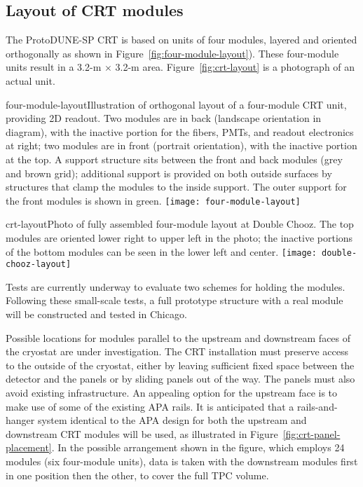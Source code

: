 \subsection{Layout of CRT modules}

The ProtoDUNE-SP CRT is based on units of four modules, layered and oriented orthogonally as shown in Figure~\ref{fig:four-module-layout}). These four-module units result in a 3.2-m $\times$ 3.2-m area.  Figure~\ref{fig:crt-layout} is a photograph of an actual unit.

\begin{cdrfigure}{four-module-layout}{Illustration of orthogonal layout of a four-module CRT unit, providing 2D readout. Two modules are in back (landscape orientation in diagram), with the inactive portion for the fibers, PMTs, and readout electronics at right; two modules are in front (portrait orientation), with the inactive portion at the top. A support structure sits between the front and back modules (grey and brown grid); additional support is provided on both outside surfaces by structures that clamp the modules to the inside support. The outer support for the front modules is shown in green.}
  \texttt{[image: four-module-layout]}
 \end{cdrfigure}


\begin{cdrfigure}{crt-layout}{Photo of fully assembled four-module layout at Double Chooz. The top modules are oriented lower right to upper left in the photo; the inactive portions of the bottom modules can be seen in the lower left and center.}
  \texttt{[image: double-chooz-layout]}
\end{cdrfigure}

Tests are currently underway to evaluate two schemes for holding the modules. Following these small-scale tests, a full prototype structure with a real module will be constructed and tested in Chicago.

Possible locations for modules parallel to the upstream and downstream faces of the cryostat are under investigation. %
The CRT installation must preserve access to the outside of the cryostat, either by leaving sufficient fixed space between the detector and the panels or by sliding panels out of the way. 
The panels must also avoid existing infrastructure. An appealing option for the upstream face is to make use of some of the existing APA rails. It is anticipated that a rails-and-hanger system identical to the APA design for both the upstream and downstream CRT modules will be used, as illustrated in Figure~\ref{fig:crt-panel-placement}. In the possible arrangement shown in the figure, which employs 24 modules (six four-module units), data is taken with the downstream modules first in one position then the other, to cover the full TPC volume.


